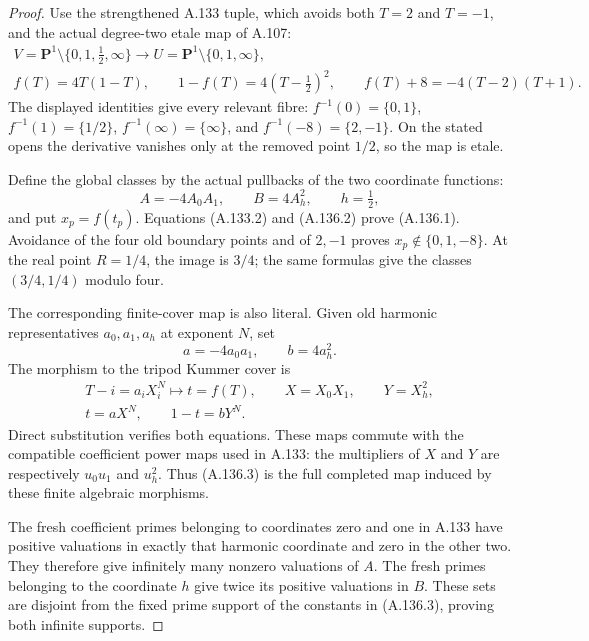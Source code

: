 \begin{proof}
Use the strengthened A.133 tuple, which avoids both
\(T=2\) and \(T=-1\), and the actual degree-two etale
map of A.107:
\[
 \begin{gathered}
 V=\mathbf P^1\setminus\{0,1,\tfrac12,\infty\}
       \longrightarrow U=\mathbf P^1\setminus\{0,1,\infty\},\\
 f(T)=4T(1-T),\qquad
       1-f(T)=4(T-\tfrac12)^2,\qquad
       f(T)+8=-4(T-2)(T+1).
 \end{gathered}
\tag{A.136.2}
\]
The displayed identities give every relevant fibre:
\(f^{-1}(0)=\{0,1\}\),
\(f^{-1}(1)=\{1/2\}\),
\(f^{-1}(\infty)=\{\infty\}\), and
\(f^{-1}(-8)=\{2,-1\}\).
On the stated opens the derivative vanishes only
at the removed point \(1/2\), so the map is etale.

Define the global classes by the actual pullbacks
of the two coordinate functions:
\[
                A=-4A_0A_1,\qquad B=4A_h^2,
                       \qquad h=\tfrac12,
\tag{A.136.3}
\]
and put \(x_p=f(t_p)\).
Equations (A.133.2) and (A.136.2) prove (A.136.1).
Avoidance of the four old boundary points and of
\(2,-1\) proves \(x_p\notin\{0,1,-8\}\).
At the real point \(R=1/4\), the image is \(3/4\);
the same formulas give the classes \((3/4,1/4)\)
modulo four.

The corresponding finite-cover map is also literal.
Given old harmonic representatives \(a_0,a_1,a_h\)
at exponent \(N\), set
\[
               a=-4a_0a_1,\qquad b=4a_h^2 .
\]
The morphism to the tripod Kummer cover is
\[
 \begin{gathered}
 T-i=a_iX_i^N
      \longmapsto
        t=f(T),\qquad X=X_0X_1,\qquad Y=X_h^2,\\
                       t=aX^N,\qquad1-t=bY^N.
 \end{gathered}
\tag{A.136.4}
\]
Direct substitution verifies both equations.
These maps commute with the compatible coefficient
power maps used in A.133: the multipliers of \(X\)
and \(Y\) are respectively \(u_0u_1\) and \(u_h^2\).
Thus (A.136.3) is the full completed map induced by
these finite algebraic morphisms.

The fresh coefficient primes belonging to coordinates
zero and one in A.133 have positive valuations in
exactly that harmonic coordinate and zero in the
other two.  They therefore give infinitely many
nonzero valuations of \(A\).
The fresh primes belonging to the coordinate \(h\)
give twice its positive valuations in \(B\).
These sets are disjoint from the fixed prime support
of the constants in (A.136.3), proving both infinite
supports.


\end{proof}
